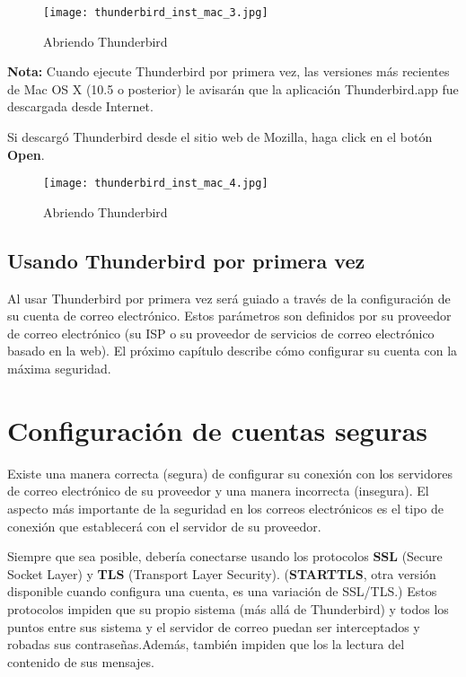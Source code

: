 \documentclass[10pt,a5paper,twoside,,]{book}
\begin{document}
\begin{figure}[htbp]
\centering
\texttt{[image: thunderbird\_inst\_mac\_3.jpg]}
\caption{Abriendo Thunderbird}
\end{figure}

\textbf{Nota:} Cuando ejecute Thunderbird por primera vez, las versiones
más recientes de Mac OS X (10.5 o posterior) le avisarán que la
aplicación Thunderbird.app fue descargada desde Internet.

Si descargó Thunderbird desde el sitio web de Mozilla, haga click en el
botón \textbf{Open}.

\begin{figure}[htbp]
\centering
\texttt{[image: thunderbird\_inst\_mac\_4.jpg]}
\caption{Abriendo Thunderbird}
\end{figure}

\section{Usando Thunderbird por primera
vez}\label{usando-thunderbird-por-primera-vez}

Al usar Thunderbird por primera vez será guiado a través de la
configuración de su cuenta de correo electrónico. Estos parámetros son
definidos por su proveedor de correo electrónico (su ISP o su proveedor
de servicios de correo electrónico basado en la web). El próximo
capítulo describe cómo configurar su cuenta con la máxima seguridad.

\chapter{Configuración de cuentas
seguras}\label{configuraciuxf3n-de-cuentas-seguras}

Existe una manera correcta (segura) de configurar su conexión con los
servidores de correo electrónico de su proveedor y una manera incorrecta
(insegura). El aspecto más importante de la seguridad en los correos
electrónicos es el tipo de conexión que establecerá con el servidor de
su proveedor.

Siempre que sea posible, debería conectarse usando los protocolos
\textbf{SSL} (Secure Socket Layer) y \textbf{TLS} (Transport Layer
Security). (\textbf{STARTTLS}, otra versión disponible cuando configura
una cuenta, es una variación de SSL/TLS.) Estos protocolos impiden que
su propio sistema (más allá de Thunderbird) y todos los puntos entre sus
sistema y el servidor de correo puedan ser interceptados y robadas sus
contraseñas.Además, también impiden que los la lectura del contenido de
sus mensajes.
\end{document}
